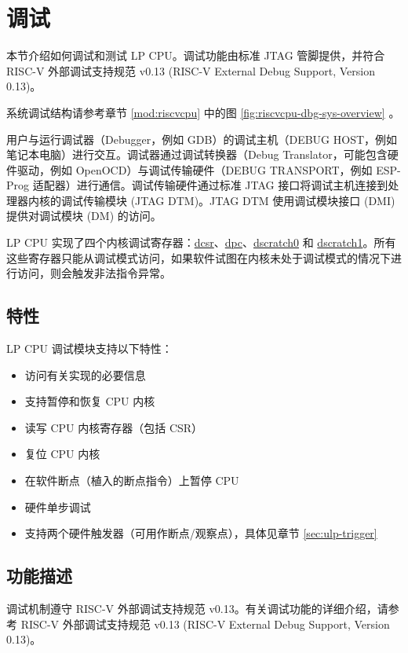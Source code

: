 \documentclass[main\_\_CN.tex]{subfiles}
\begin{document}
\section{调试}

本节介绍如何调试和测试 LP CPU。调试功能由标准 JTAG 管脚提供，并符合 RISC-V 外部调试支持规范 v0.13 (RISC-V External Debug Support, Version 0.13)。

\chipname{} 系统调试结构请参考章节 \ref{mod:riscvcpu} \textit{} 中的图 \ref{fig:riscvcpu-dbg-sys-overview} \textit{}。

用户与运行调试器（Debugger，例如 GDB）的调试主机（DEBUG HOST，例如笔记本电脑）进行交互。调试器通过调试转换器（Debug Translator，可能包含硬件驱动，例如 OpenOCD）与调试传输硬件（DEBUG TRANSPORT，例如 ESP-Prog 适配器）进行通信。调试传输硬件通过标准 JTAG 接口将调试主机连接到处理器内核的调试传输模块 (JTAG DTM)。JTAG DTM 使用调试模块接口 (DMI) 提供对调试模块 (DM) 的访问。

LP CPU 实现了四个内核调试寄存器：\hyperref[regdesc:LPDCSR]{dcsr}、\hyperref[regdesc:LPDPC]{dpc}、\hyperref[regdesc:LPDSCRATCH0]{dscratch0} 和 \hyperref[regdesc:LPDSCRATCH1]{dscratch1}。所有这些寄存器只能从调试模式访问，如果软件试图在内核未处于调试模式的情况下进行访问，则会触发非法指令异常。

\subsection{特性}
LP CPU 调试模块支持以下特性：
\begin{itemize}
    \item 访问有关实现的必要信息
    \item 支持暂停和恢复 CPU 内核
    \item 读写 CPU 内核寄存器（包括 CSR）
    \item 复位 CPU 内核
    \item 在软件断点（植入的断点指令）上暂停 CPU
    \item 硬件单步调试
    \item 支持两个硬件触发器（可用作断点/观察点），具体见章节 \ref{sec:ulp-trigger}
\end{itemize}

\subsection{功能描述}
调试机制遵守 RISC-V 外部调试支持规范 v0.13。有关调试功能的详细介绍，请参考 RISC-V 外部调试支持规范 v0.13 (RISC-V External Debug Support, Version 0.13)。
\end{document}
